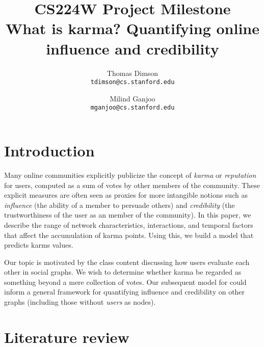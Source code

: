 \documentclass[10pt]{article}
\title{{\large CS224W Project Milestone} \\
  What is karma? Quantifying online influence and credibility
}
\author{Thomas Dimson \\ {\tt tdimson@cs.stanford.edu}
  \and
  Milind Ganjoo \\ {\tt mganjoo@cs.stanford.edu}
}
\date{}
\begin{document}
\maketitle


\section{Introduction}

Many online communities explicitly publicize the concept of \textit{karma} or
\textit{reputation} for users, computed as a sum of votes by other members of
the community. These explicit measures are often seen as proxies for more
intangible notions such as \textit{influence} (the ability of a member to
persuade others) and \textit{credibility} (the trustworthiness of the user as an
member of the community). In this paper, we describe the range of network
characteristics, interactions, and temporal factors that affect the accumulation
of karma points. Using this, we build a model that predicts karms values.

Our topic is motivated by the class content discussing how users evaluate
each other in social graphs. We wish to determine whether karma be regarded
as something beyond a mere collection of votes. Our subsequent model for 
could inform a general framework for quantifying influence and credibility
on other graphs (including those without \textit{users} as nodes).

\section{Literature review}
\end{document}
